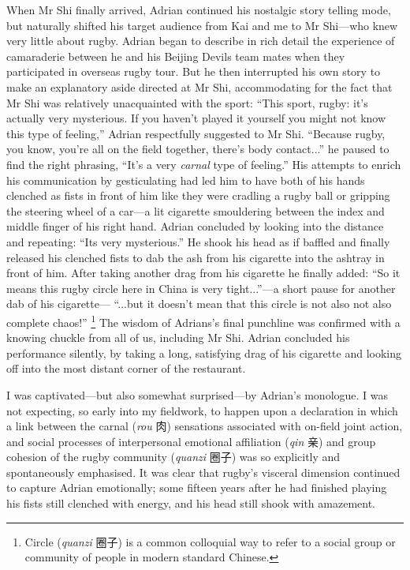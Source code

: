 \begin{CJK}{UTF8}{gbsn}
When Mr Shi finally arrived, Adrian continued his nostalgic story telling mode, but naturally shifted his target audience from Kai and me to Mr Shi---who knew very little about rugby.  Adrian began to describe in rich detail the experience of camaraderie between he and his Beijing Devils team mates when they participated in overseas rugby tour.  But he then interrupted his own story to make an explanatory aside directed at Mr Shi, accommodating for the fact that Mr Shi was relatively unacquainted with the sport: ``This sport, rugby: it's actually very mysterious. If you haven't played it yourself you might not know this type of feeling,'' Adrian respectfully suggested to Mr Shi.  ``Because rugby, you know, you're all on the field together, there's body contact...'' he paused to find the right phrasing,  ``It's a very \textit{carnal} type of feeling.''  His attempts to enrich his communication by gesticulating had led him to have both of his hands clenched as fists in front of him like they were cradling a rugby ball or gripping the steering wheel of a car---a lit cigarette smouldering between the index and middle finger of his right hand.  Adrian concluded by looking into the distance and repeating: ``Its very mysterious.'' He shook his head as if baffled and finally released his clenched fists to dab the ash from his cigarette into the ashtray in front of him.  After taking another drag from his cigarette he finally added: ``So it means this rugby circle here in China is very tight...''---a short pause for another dab of his cigarette--- ``...but it doesn't mean that this circle is not also not also complete chaos!''
  \footnote{Circle (\textit{quanzi} 圈子) is a common colloquial way to refer to a social group or community of people in modern standard Chinese.}
The wisdom of Adrians's final punchline was confirmed with a knowing chuckle from all of us, including Mr Shi. Adrian concluded his performance silently, by taking a long, satisfying drag of his cigarette and looking off into the most distant corner of the restaurant.


I was captivated---but also somewhat surprised---by Adrian's monologue.  I was not expecting, so early into my fieldwork, to happen upon a declaration in which a link between the carnal (\textit{rou} 肉) sensations associated with on-field joint action, and social processes of interpersonal emotional affiliation (\textit{qin} 亲) and group cohesion of the rugby community (\textit{quanzi} 圈子) was so explicitly and spontaneously emphasised.  It was clear that rugby's visceral dimension continued to capture Adrian emotionally; some fifteen years after he had finished playing his fists still clenched with energy, and his head still shook with amazement.


\end{CJK}

